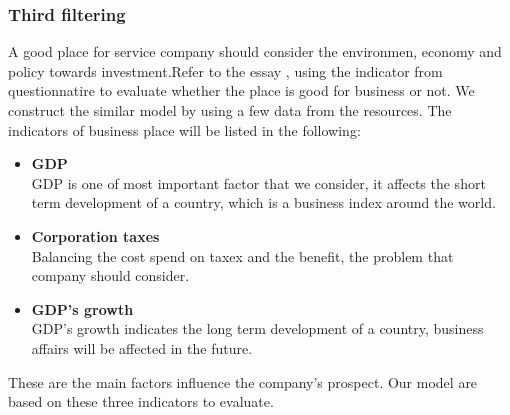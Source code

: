 \documentclass{mcmthesis}
\begin{document}
\subsubsection {Third filtering}

A good place for service company should consider the environmen, economy and policy towards investment.Refer to the essay \cite{eiu}, using the indicator 
from questionnatire to evaluate whether the place is good for business or not. We construct the similar model by using a few data from the resources.
The indicators of business place will be listed in the following:
\begin{itemize}
\item \textbf{GDP}\\
GDP is one of most important factor that we consider, it affects the short term development of a country, which is a business index around the world.
\item \textbf{Corporation taxes}\\
Balancing the cost spend on taxex and the benefit, the problem that company should consider.
\item \textbf{GDP's growth} \\
GDP's growth indicates the long term development of a country, business affairs will be affected in the future.
\end{itemize}
These are the main factors influence the company's prospect. Our model are based on these three indicators to evaluate. 
\end{document}
